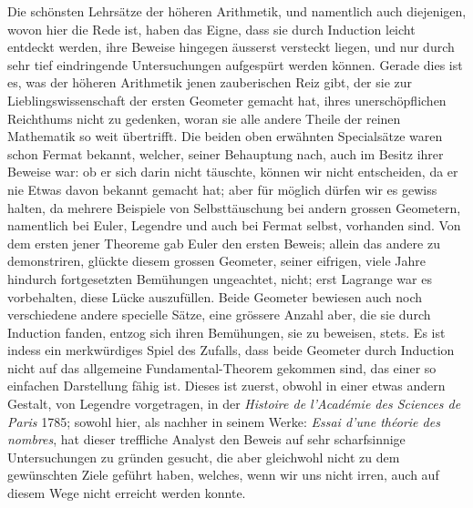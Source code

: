 \documentclass[12pt]{article}
\begin{document}
Die schönsten Lehrsätze der höheren Arithmetik, und namentlich auch diejenigen, wovon hier die Rede ist, haben das Eigne, dass sie durch Induction leicht entdeckt werden, ihre Beweise hingegen äusserst versteckt liegen, und nur durch sehr tief eindringende Untersuchungen aufgespürt werden können. Gerade dies ist es, was der höheren Arithmetik jenen zauberischen Reiz gibt, der sie zur Lieblingswissenschaft der ersten Geometer gemacht hat, ihres unerschöpflichen Reichthums nicht zu gedenken, woran sie alle andere Theile der reinen Mathematik so weit übertrifft. Die beiden oben erwähnten Specialsätze waren schon Fermat bekannt, welcher, seiner Behauptung nach, auch im Besitz ihrer Beweise war: ob er sich darin nicht täuschte, können wir nicht entscheiden, da er nie Etwas davon bekannt gemacht hat; aber für möglich dürfen wir es gewiss halten, da mehrere Beispiele von Selbsttäuschung bei andern grossen Geometern, namentlich bei Euler, Legendre und auch bei Fermat selbst, vorhanden sind. Von dem ersten jener Theoreme gab Euler den ersten Beweis; allein das andere zu demonstriren, glückte diesem grossen Geometer, seiner eifrigen, viele Jahre hindurch fortgesetzten Bemühungen ungeachtet, nicht; erst Lagrange war es vorbehalten, diese Lücke auszufüllen. Beide Geometer bewiesen auch noch verschiedene andere specielle Sätze, eine grössere Anzahl aber, die sie durch Induction fanden, entzog sich ihren Bemühungen, sie zu beweisen, stets. Es ist indess ein merkwürdiges Spiel des Zufalls, dass beide Geometer durch Induction nicht auf das allgemeine Fundamental-Theorem gekommen sind, das einer so einfachen Darstellung fähig ist. Dieses ist zuerst, obwohl in einer etwas andern Gestalt, von Legendre vorgetragen, in der \textit{Histoire de l'Académie des Sciences de Paris} 1785; sowohl hier, als nachher in seinem Werke: \textit{Essai d'une théorie des nombres}, hat dieser treffliche Analyst den Beweis auf sehr scharfsinnige Untersuchungen zu gründen gesucht, die aber gleichwohl nicht zu dem gewünschten Ziele geführt haben, welches, wenn wir uns nicht irren, auch auf diesem Wege nicht erreicht werden konnte.
\end{document}
